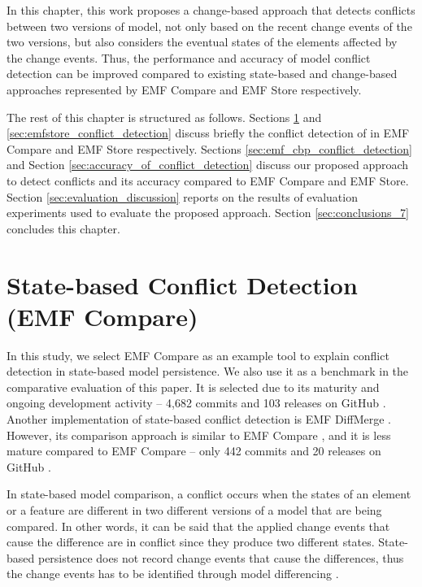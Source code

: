 In this chapter, this work proposes a change-based approach that detects conflicts between two versions of model, not only based on the recent change events of the two versions, but also considers the eventual states of the elements affected by the change events. Thus, the performance and accuracy of model conflict detection can be improved compared to existing state-based and change-based approaches represented by EMF Compare and EMF Store respectively.

The rest of this chapter is structured as follows. Sections \ref{sec:emfcompare_conflict_detection} and \ref{sec:emfstore_conflict_detection} discuss briefly the conflict detection of in EMF Compare and EMF Store respectively. Sections \ref{sec:emf_cbp_conflict_detection} and Section \ref{sec:accuracy_of_conflict_detection} discuss our proposed approach to detect conflicts and its accuracy compared to EMF Compare and EMF Store. Section \ref{sec:evaluation_discussion} reports on the results of evaluation experiments used to evaluate the proposed approach. Section \ref{sec:conclusions_7} concludes this chapter.

\section{State-based Conflict Detection (EMF Compare)}
\label{sec:emfcompare_conflict_detection}

In this study, we select EMF Compare \cite{emfcompare2018developer} as an example tool to explain conflict detection in state-based model persistence. We also use it as a benchmark in the comparative evaluation of this paper. It is selected due to its maturity and ongoing development activity -- 4,682 commits and 103 releases on GitHub \cite{github2019emfcompare}. Another implementation of state-based conflict detection is EMF DiffMerge \cite{eclipse2019emfdiffmerge}. However, its comparison approach is similar to EMF Compare \cite{eclipse2019emfdiffmerge}, and it is less mature compared to EMF Compare -- only 442 commits and 20 releases on GitHub \cite{github2019emfdiffmerge}.

In state-based model comparison, a conflict occurs when the states of an element or a feature are different in two different versions of a model that are being compared. In other words, it can be said that the applied change events that cause the difference are in conflict since they produce two different states. State-based persistence does not record change events that cause the differences, thus the change events has to be identified through model differencing \cite{emfcompare2018developer,yohannis2019efficient}. 


